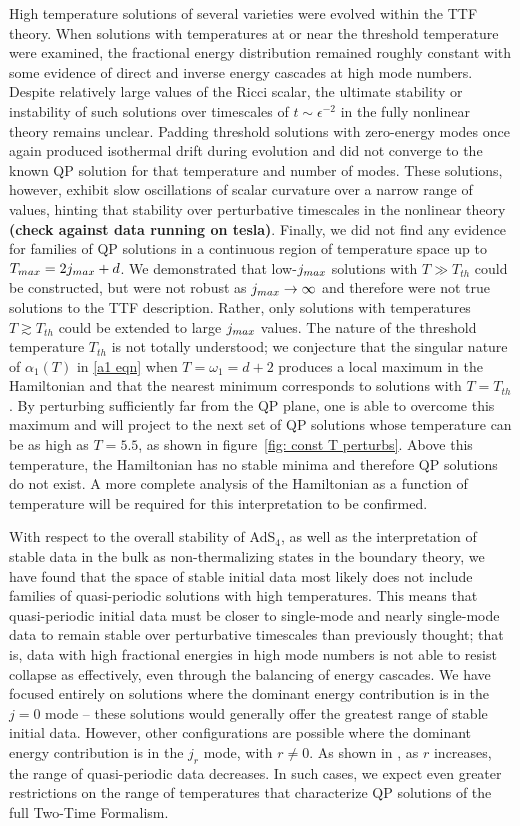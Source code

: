 \documentclass[../PhD.tex]{subfiles}
\begin{document}
High temperature solutions of several varieties were evolved within the TTF theory. When solutions with temperatures at or near the threshold temperature were examined, the fractional energy distribution remained roughly constant with some evidence of direct and inverse energy cascades at high mode numbers. Despite relatively large values of the Ricci scalar, the ultimate stability or instability of such solutions over timescales of $t \sim \epsilon^{-2}$ in the fully nonlinear theory remains unclear. Padding threshold solutions with zero-energy modes once again produced isothermal drift during evolution and did not converge to the known QP solution for that temperature and number of modes. These solutions, however, exhibit slow oscillations of scalar curvature over a narrow range of values, hinting that stability over perturbative timescales in the nonlinear theory {\bf (check against data running on tesla)}. Finally, we did not find any evidence for families of QP solutions in a continuous region of temperature space up to $T_{max} = 2j_{max} + d$. We demonstrated that low-$j_{max}$ solutions with $T \gg T_{th}$ could be constructed, but were not robust as $j_{max} \to \infty$ and therefore were not true solutions to the TTF description. Rather, only solutions with temperatures $T \gtrsim T_{th}$ could be extended to large $j_{max}$ values. The nature of the threshold temperature $T_{th}$ is not totally understood; we conjecture that the singular nature of $\alpha_1 (T)$ in \eqref{a1 eqn} when $T = \omega_1 = d + 2$ produces a local maximum in the Hamiltonian and that the nearest minimum corresponds to solutions with $T = T_{th}$. By perturbing sufficiently far from the QP plane, one is able to overcome this maximum and will project to the next set of QP solutions whose temperature can be as high as $T = 5.5$, as shown in figure~\ref{fig: const T perturbs}. Above this temperature, the Hamiltonian has no stable minima and therefore QP solutions do not exist. A more complete analysis of the Hamiltonian as a function of temperature will be required for this interpretation to be confirmed.

With respect to the overall stability of AdS$_4$, as well as the interpretation of stable data in the bulk as non-thermalizing states in the boundary theory, we have found that the space of stable initial data most likely does not include families of quasi-periodic solutions with high temperatures. This means that quasi-periodic initial data must be closer to single-mode and nearly single-mode data to remain stable over perturbative timescales than previously thought; that is, data with high fractional energies in high mode numbers is not able to resist collapse as effectively, even through the balancing of energy cascades. We have focused entirely on solutions where the dominant energy contribution is in the $j = 0$ mode -- these solutions would generally offer the greatest range of stable initial data. However, other configurations are possible where the dominant energy contribution is in the $j_r$ mode, with $r \neq 0$. As shown in \cite{1507.08261}, as $r$ increases, the range of quasi-periodic data decreases. In such cases, we expect even greater restrictions on the range of temperatures that characterize QP solutions of the full Two-Time Formalism. 
\end{document}
